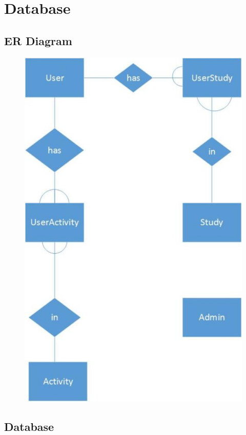 \documentclass[12pt]{report}
\begin{document}
\section{Database}
\subsection{ER Diagram}
\begin{figure}[!htb]
  \includegraphics{0.PNG}
\end{figure}


\newpage
\subsection{Database}
\newpage
\end{document}
